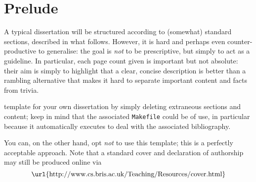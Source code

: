 \documentclass[ %
                    author={Jonathan Rankin},
                supervisor={Dr. David May, Dr. Ian Holyer},
                    degree={MEng},
                     title={CodeTouch},
                  subtitle={A Revolutionary Way To Program Real Code On Touch Screen Devices},
                      type={enterprise},
                      year={2015 } ]{dissertation}
\begin{document}


\section*{Prelude}
\thispagestyle{empty}

A typical dissertation will be structured according to (somewhat) standard 
sections, described in what follows.  However, it is hard and perhaps even 
counter-productive to generalise: the goal is {\em not} to be prescriptive, 
but simply to act as a guideline.  In particular, each page count given is
important but not absolute: their aim is simply to highlight that a clear, 
concise description is better than a rambling alternative that makes it 
hard to separate important content and facts from trivia.

template for your own dissertation by simply deleting extraneous sections
and content; keep in mind that the associated {\tt Makefile} could be of
use, in particular because it automatically executes \mbox{\BibTeX} to 
deal with the associated bibliography.  

You can, on the other hand, opt {\em not} to use this template; this is a 
perfectly acceptable approach.  Note that a standard cover and declaration 
of authorship may still be produced online via
\[
\mbox{\url{http://www.cs.bris.ac.uk/Teaching/Resources/cover.html}}
\]



\maketitle

\end{document}
